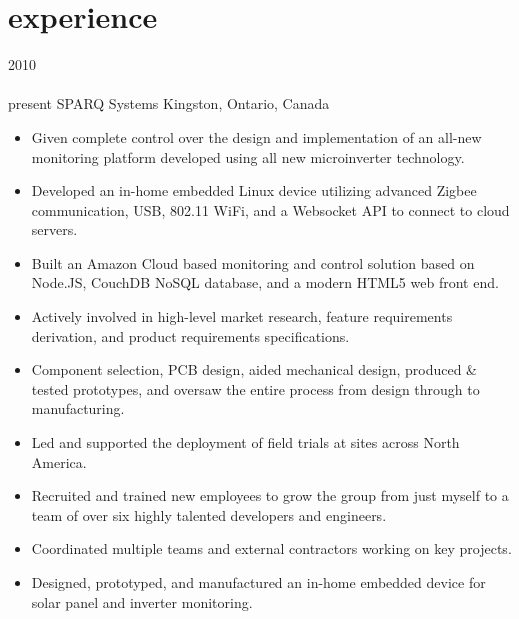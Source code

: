 
\section{experience}

\begin{entrylist}
\entry
  {2010\\\faChevronDown\\{\bodyfontit present}}
  {SPARQ Systems}
  {Kingston, Ontario, Canada}
  {
\begin{itemize}[leftmargin=12pt]
	\item Given complete control over the design and implementation of an all-new monitoring platform developed using all new microinverter technology.
  \item Developed an in-home {\bodyfontit embedded Linux} device utilizing advanced {\bodyfontit Zigbee} communication, USB, 802.11 {\bodyfontit WiFi}, and a {\bodyfontit Websocket} API to connect to cloud servers.
  \item Built an Amazon {\bodyfontit Cloud} based monitoring and control solution based on {\bodyfontit Node.JS}, CouchDB {\bodyfontit NoSQL} database, and a modern {\bodyfontit HTML5} web front end.
	\item Actively involved in high-level market research, feature requirements derivation, and product requirements specifications.
	\item Component selection, {\bodyfontit PCB} design, aided mechanical design, produced \& tested {\bodyfontit prototypes}, and oversaw the entire process from {\bodyfontit design} through to {\bodyfontit manufacturing}.
  \item Led and supported the deployment of field trials at sites across North America.
	\item Recruited and trained new employees to grow the group from just myself to a team of over six highly talented developers and engineers.
	\item Coordinated multiple teams and external contractors working on key projects.
\end{itemize}
\begin{itemize}[leftmargin=12pt]
	\item Designed, prototyped, and manufactured an in-home embedded device for solar panel and inverter monitoring.

\end{itemize}}
\end{entrylist}
